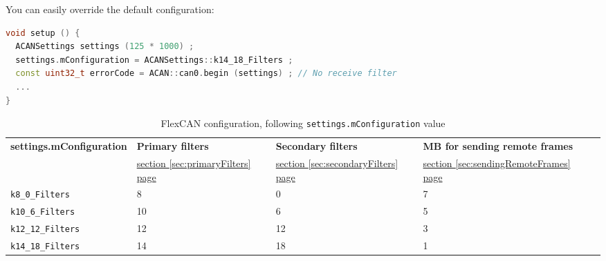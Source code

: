 \documentclass[10pt, a4paper, obeyspaces, openany]{extarticle}
\newcommand\refSectionPage[1]{\hyperref[sec:#1]{section \ref*{sec:#1} page \pageref{sec:#1}}}
\newcommand\labelTableau[1]{\label{tab:#1}}
\begin{document}
You can easily override the default configuration:
{ \small\begin{lstlisting}[language=c++]
void setup () {
  ACANSettings settings (125 * 1000) ;
  settings.mConfiguration = ACANSettings::k14_18_Filters ;
  const uint32_t errorCode = ACAN::can0.begin (settings) ; // No receive filter
  ...
}
\end{lstlisting}}


\begin{table}[!ht]
  \small
  \onehalfspacing
  \centering
  \begin{tabular}{lllll}
    \textbf{settings.mConfiguration}& \textbf{Primary filters} & \textbf{Secondary filters} & \textbf{MB for sending remote frames} \\
                                   & \refSectionPage{primaryFilters} & \refSectionPage{secondaryFilters} & \refSectionPage{sendingRemoteFrames} \\
    \texttt{k8\_0\_Filters} & 8 & 0 & 7\\
    \texttt{k10\_6\_Filters} & 10 & 6 & 5\\
    \texttt{k12\_12\_Filters} & 12 & 12 & 3\\
    \texttt{k14\_18\_Filters} & 14 & 18 & 1\\
  \end{tabular}
  \caption{FlexCAN configuration, following \texttt{settings.mConfiguration} value}
  \labelTableau{configFlexCAN}
\end{table}










%
%
%
%
\end{document}
